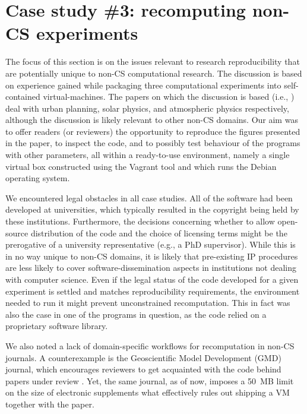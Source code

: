 \section{Case study \#3: recomputing non-CS experiments}
\label{s:group3}

The focus of this section is on the issues relevant to research reproducibility that are potentially unique to non-CS computational research.
The discussion is based on experience gained while packaging three computational experiments into self-contained virtual-machines.
The papers on which the discussion is based (i.e., \cite{danielpaper,bareford2010nanoflare,arabas2013libcloud}) deal with urban planning, solar physics, and atmospheric physics respectively, although the discussion is likely relevant to other non-CS domains.
Our aim was to offer readers (or reviewers) the opportunity to reproduce the figures presented in the paper, to inspect the code, and to possibly test behaviour of the programs with other parameters, all within a ready-to-use environment, namely a single virtual box constructed using the Vagrant tool and which runs the Debian operating system.

%
We encountered legal obstacles in all case studies.
All of the software had been developed at universities, which typically resulted in the copyright being held by these institutions.
Furthermore, the decisions concerning whether to allow open-source distribution of the code and the choice of licensing terms might be the prerogative of a university representative (e.g., a PhD supervisor).
While this is in no way unique to non-CS domains, it is likely that pre-existing IP procedures are less likely to cover software-dissemination aspects in institutions not dealing with computer science.
Even if the legal status of the code developed for a given experiment is settled and matches reproducibility requirements, the environment needed to run it might prevent unconstrained recomputation.
This in fact was also the case in one of the programs in question, as the code relied on a proprietary software library.

We also noted a lack of domain-specific workflows for recomputation in non-CS journals.
A counterexample is the Geoscientific Model Development (GMD) journal, which encourages reviewers to get
  acquainted with the code behind papers under review \citep{GMD_editorial_2013}.
Yet, the same journal, as of now, imposes a 50~MB limit on the size of electronic supplements 
  what effectively rules out shipping a VM together with the paper.

